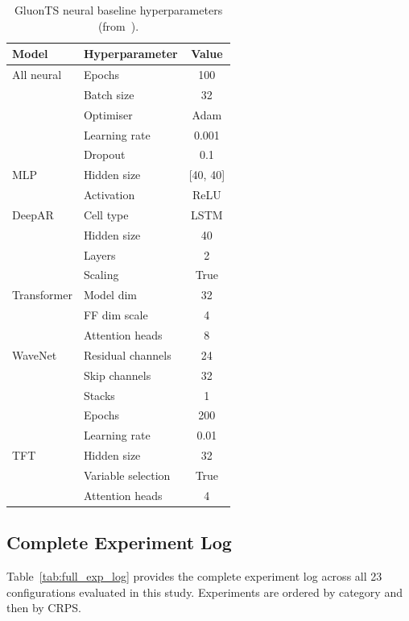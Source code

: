 \begin{table}[H]
\centering
\caption{GluonTS neural baseline hyperparameters (from~\protect\cite{smyl2025anyquantile}).}
\label{tab:gluonts_hparams}
\begin{tabular}{llc}
\toprule
\textbf{Model} & \textbf{Hyperparameter} & \textbf{Value} \\
\midrule
All neural & Epochs & 100 \\
           & Batch size & 32 \\
           & Optimiser & Adam \\
           & Learning rate & 0.001 \\
           & Dropout & 0.1 \\
\midrule
MLP        & Hidden size & {[40, 40]} \\
           & Activation & ReLU \\
\midrule
DeepAR     & Cell type & LSTM \\
           & Hidden size & 40 \\
           & Layers & 2 \\
           & Scaling & True \\
\midrule
Transformer & Model dim & 32 \\
           & FF dim scale & 4 \\
           & Attention heads & 8 \\
\midrule
WaveNet    & Residual channels & 24 \\
           & Skip channels & 32 \\
           & Stacks & 1 \\
           & Epochs & 200 \\
           & Learning rate & 0.01 \\
\midrule
TFT        & Hidden size & 32 \\
           & Variable selection & True \\
           & Attention heads & 4 \\
\bottomrule
\end{tabular}
\end{table}

\begin{center}
   \chapter{Complete Experiment Log}
\end{center}
\label{annex:explog}

\noindent
Table~\ref{tab:full_exp_log} provides the complete experiment log
across all 23 configurations evaluated in this study. Experiments
are ordered by category and then by CRPS.

